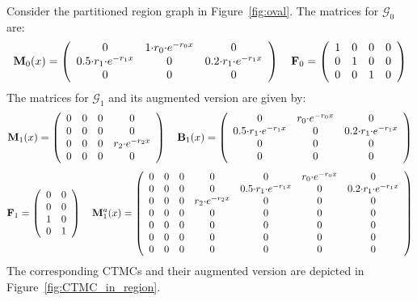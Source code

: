 \documentclass{LMCS}
\newcommand{\<}{\langle}
\renewcommand{\>}{\rangle}
\newcommand{\mG}{\mathcal{G}}
\newcommand{\CTMC}{\textsc{{CTMC}}}
\newcommand{\bdF}{{\bf F}}
\newcommand{\bdB}{{\bf B}}
\newcommand{\bdM}{{\bf M}}
\begin{document}
\begin{exa}
Consider the partitioned region graph in Figure~\ref{fig:oval}.
The matrices for $\mG_0$ are:
\[
\bdM_0(x)=\left(
\begin{array}{ccc}
0& 1{\cdot} r_0{\cdot}e^{-r_0x} & 0\\
0.5{\cdot}r_1{\cdot} e^{-r_1x}& 0 &0.2{\cdot}r_1{\cdot} e^{-r_1x} \\
0 &0& 0
\end{array} \right)
\quad
\bdF_0 =\left(
\begin{array}{cccc}
1& 0 & 0 & 0\\
0& 1 & 0 & 0\\
0& 0 & 1 & 0
\end{array} \right)
\]
The matrices for $\mG_1$ and its augmented version are given by:
\[
\bdM_1(x)=\left(
\begin{array}{cccc}
0& 0 & 0 & 0\\
0 & 0& 0&0\\
0 & 0 & 0 & r_2{\cdot} e^{-r_2x} \\
0 &0& 0 &0
\end{array} \right)
\quad \bdB_1(x) =\left(
\begin{array}{ccc}
0 & r_0{\cdot}e^{-r_0x} &0\\
0.5{\cdot}r_1{\cdot}e^{-r_1x} & 0 &0.2{\cdot}r_1{\cdot}e^{-r_1x}\\
0 & 0 &0\\
0 & 0 &0
\end{array} \right)
\]
\[
\bdF_1 =\left(
\begin{array}{cc}
0 & 0\\
0 & 0 \\
1 & 0 \\
0 & 1
\end{array} \right)
\quad \bdM_1^a(x)=\left(
\begin{array}{ccccccc}
0& 0 & 0 & 0 & 0&  r_0{\cdot}e^{-r_0x}&0\\
0 & 0& 0&0 & 0.5 {\cdot} r_1{\cdot}e^{-r_1x} & 0 & 0.2 {\cdot} r_1{\cdot}e^{-r_1x}\\
0 & 0 & 0 & r_2{\cdot} e^{-r_2x} & 0 & 0 & 0\\
0 &0& 0 &0 & 0 & 0 & 0 \\
0 &0& 0 &0 & 0 & 0 & 0 \\
0 &0& 0 &0 & 0 & 0 & 0 \\
0 &0& 0 &0 & 0 & 0 & 0
\end{array} \right)
\]
The corresponding \CTMC s and their augmented version are depicted in Figure~\ref{fig:CTMC_in_region}.
\end{exa}
\end{document}
